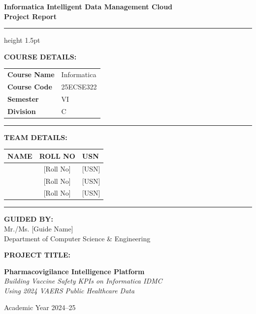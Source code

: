 \documentclass[12pt,a4paper]{report}
\begin{document}

\begin{titlepage}
\centering

\vspace*{10mm}
{\LARGE\bfseries\color{infblue} Informatica Intelligent Data Management Cloud}\\[4pt]
{\Large\bfseries Project Report}

\vspace{12mm}
\hrule height 1.5pt
\vspace{8mm}

{\large\bfseries COURSE DETAILS:}\\[8pt]
\begin{tabular}{ll}
  \textbf{Course Name}  & Informatica \\
  \textbf{Course Code}  & 25ECSE322   \\
  \textbf{Semester}     & VI          \\
  \textbf{Division}     & C           \\
\end{tabular}

\vspace{12mm}
\hrule
\vspace{10mm}

{\large\bfseries TEAM DETAILS:}\\[10pt]
\begin{tabular}{|l|c|l|}
\hline
\textbf{NAME} & \textbf{ROLL NO} & \textbf{USN} \\
\hline
[Member 1 Name] & [Roll No] & [USN] \\
\hline
[Member 2 Name] & [Roll No] & [USN] \\
\hline
[Member 3 Name] & [Roll No] & [USN] \\
\hline
\end{tabular}

\vspace{14mm}
\hrule
\vspace{10mm}

{\large\bfseries GUIDED BY:}\\[6pt]
{\large Mr./Ms. [Guide Name]}\\[2pt]
{\normalsize Department of Computer Science \& Engineering}

\vfill

{\large\bfseries PROJECT TITLE:}\\[6pt]
\begin{mdframed}[linecolor=infblue, linewidth=1.5pt]
\centering
\textbf{\large Pharmacovigilance Intelligence Platform}\\[4pt]
\textit{Building Vaccine Safety KPIs on Informatica IDMC\\
Using 2024 VAERS Public Healthcare Data}
\end{mdframed}

\vspace{10mm}
{\normalsize Academic Year 2024--25}

\end{titlepage}
\end{document}
